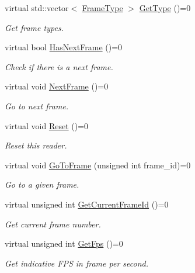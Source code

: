 \begin{DoxyCompactItemize}
virtual std\+::vector$<$ \hyperlink{namespacemoetsi_1_1ssp_a46efdfa2cd5a28ead465dcc8006b5a87}{Frame\+Type} $>$ \hyperlink{classmoetsi_1_1ssp_1_1IReader_a4116c1931fde7bd66133934ffdca1cce}{Get\+Type} ()=0
\begin{DoxyCompactList}\small\item\em Get frame types. \end{DoxyCompactList}\item 
virtual bool \hyperlink{classmoetsi_1_1ssp_1_1IReader_af9186ba41e136dc4ec3242b5dd55fa04}{Has\+Next\+Frame} ()=0
\begin{DoxyCompactList}\small\item\em Check if there is a next frame. \end{DoxyCompactList}\item 
\mbox{\label{classmoetsi_1_1ssp_1_1IReader_a49e82a786cca55248e27e7fac8f97a17}} 
virtual void \hyperlink{classmoetsi_1_1ssp_1_1IReader_a49e82a786cca55248e27e7fac8f97a17}{Next\+Frame} ()=0
\begin{DoxyCompactList}\small\item\em Go to next frame. \end{DoxyCompactList}\item 
\mbox{\label{classmoetsi_1_1ssp_1_1IReader_ad6e2ef78fc2466884aa877ecef54889d}} 
virtual void \hyperlink{classmoetsi_1_1ssp_1_1IReader_ad6e2ef78fc2466884aa877ecef54889d}{Reset} ()=0
\begin{DoxyCompactList}\small\item\em Reset this reader. \end{DoxyCompactList}\item 
virtual void \hyperlink{classmoetsi_1_1ssp_1_1IReader_a6f1be3c06538992cca6d550bd9566681}{Go\+To\+Frame} (unsigned int frame\+\_\+id)=0
\begin{DoxyCompactList}\small\item\em Go to a given frame. \end{DoxyCompactList}\item 
virtual unsigned int \hyperlink{classmoetsi_1_1ssp_1_1IReader_ac292d83eb06dee277baaa06e281a562d}{Get\+Current\+Frame\+Id} ()=0
\begin{DoxyCompactList}\small\item\em Get current frame number. \end{DoxyCompactList}\item 
virtual unsigned int \hyperlink{classmoetsi_1_1ssp_1_1IReader_a9f6a8650ca290b011b8e5451eeae9f32}{Get\+Fps} ()=0
\begin{DoxyCompactList}\small\item\em Get indicative F\+PS in frame per second. \end{DoxyCompactList}\end{DoxyCompactItemize}


